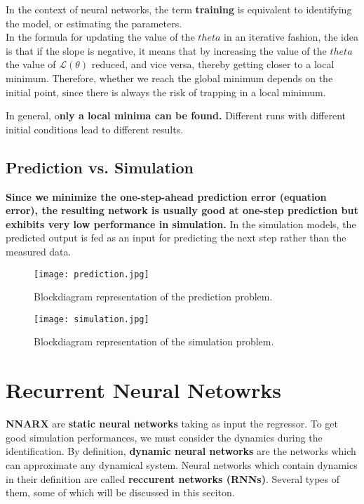 \begin{factbox}[Clarification]
In the context of neural networks, the term \textbf{training} is equivalent to identifying the model, or estimating the parameters.\\

In the formula for updating the value of the $theta$ in an iterative fashion, the idea is that if the slope is negative, it means that by increasing the value of the $theta$ the value of $\mathcal{L}(\theta)$ reduced, and vice versa, thereby getting closer to a local minimum. Therefore, whether we reach the global minimum depends on the initial point, since there is  always the risk of trapping in a local minimum.
\end{factbox}

In general, o\textbf{nly a local minima can be found.} Different runs with different initial conditions lead to different results. 

\subsection{Prediction vs. Simulation}
\textbf{Since we minimize the one-step-ahead prediction error (equation error), the resulting network is usually good at one-step prediction but exhibits very low performance in simulation.} In the simulation models, the predicted output is fed as an input for predicting the next step rather than the measured data.\\

\begin{figure}[H]
    \centering \texttt{[image: prediction.jpg]}
    \caption{Blockdiagram representation of the prediction problem.}
 \end{figure}

\begin{figure}[H]
    \centering \texttt{[image: simulation.jpg]}
    \caption{Blockdiagram representation of the simulation problem.}
 \end{figure}

\section{Recurrent Neural Netowrks}
\textbf{NNARX} are \textbf{static neural networks }taking as input the regressor. To get good simulation performances, we must consider the dynamics during the identification. By definition, \textbf{dynamic neural networks} are the networks which can approximate any dynamical system. Neural networks which contain dynamics in their definition are called \textbf{reccurent networks (RNNs)}. Several types of them, some of which will be discussed in this seciton.

